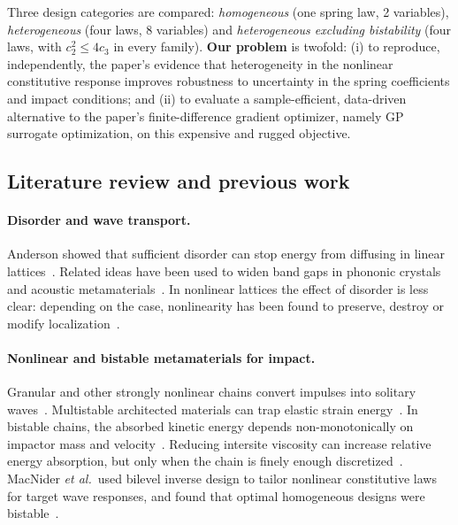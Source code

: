 \documentclass[12pt,letterpaper]{article}
\begin{document}
Three design categories are compared: \emph{homogeneous} (one spring law, 2
variables), \emph{heterogeneous} (four laws, 8 variables) and
\emph{heterogeneous excluding bistability} (four laws, with $c_2^2\le 4c_3$ in every
family). \textbf{Our problem} is twofold:
(i) to reproduce, independently, the paper's evidence that heterogeneity in the
nonlinear constitutive response improves robustness to uncertainty in the spring
coefficients and impact conditions; and
(ii) to evaluate a sample-efficient, data-driven alternative to the paper's
finite-difference gradient optimizer, namely GP surrogate optimization, on this
expensive and rugged objective.

\subsection{Literature review and previous work}

\paragraph{Disorder and wave transport.}
Anderson showed that sufficient disorder can stop energy from diffusing in linear
lattices~\cite{anderson}. Related ideas have been used to widen band gaps in phononic
crystals and acoustic metamaterials~\cite{hussein}. In nonlinear lattices the effect of
disorder is less clear: depending on the case, nonlinearity has been found to
preserve, destroy or modify localization~\cite{laptyeva}.

\paragraph{Nonlinear and bistable metamaterials for impact.}
Granular and other strongly nonlinear chains convert impulses into solitary
waves~\cite{nesterenko,patil}. Multistable architected materials can trap elastic
strain energy~\cite{shan}. In bistable chains, the absorbed kinetic energy depends
non-monotonically on impactor mass and velocity~\cite{fancher}. Reducing intersite
viscosity can increase relative energy absorption, but only when the chain is finely
enough discretized~\cite{xiu}. MacNider \emph{et al.}\ used bilevel inverse design to
tailor nonlinear constitutive laws for target wave responses, and found that optimal
homogeneous designs were bistable~\cite{macnider}.
\end{document}
